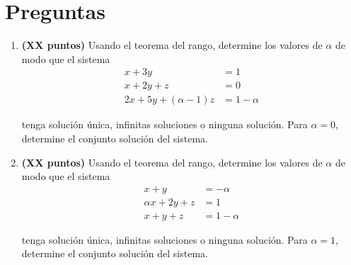 \documentclass[a4paper]{article}
\begin{document}
\section*{Preguntas}
\begin{enumerate}


    \item {\bf (XX puntos)} Usando el teorema del rango, determine los valores de $\alpha$ de modo que el sistema
    \begin{align*}
 x + 3y &= 1 \\
 x + 2y +z &= 0\\
2 x + 5y +(\alpha -1) z &= 1-\alpha 
\end{align*}

    tenga solución única, infinitas soluciones o ninguna solución. Para $\alpha=0$, determine el conjunto soluci\'on del sistema.

        \item {\bf (XX puntos)} Usando el teorema del rango, determine los valores de $\alpha$ de modo que el sistema
    \begin{align*}
 x + y &= -\alpha \\
\alpha x + 2y +z &= 1\\
 x + y + z &= 1-\alpha 
\end{align*}

    tenga solución única, infinitas soluciones o ninguna solución. Para $\alpha=1$, determine el conjunto soluci\'on del sistema.
        
        









\end{enumerate}
\end{document}
